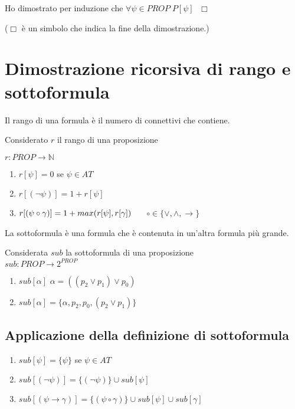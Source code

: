 \documentclass{article}
\theoremstyle{break}
\theoremstyle{break}
\theoremstyle{break}
\theoremstyle{break}
\begin{document}
Ho dimostrato per induzione che \( \forall \psi \in PROP \; P[\psi] \; \) \( \Box \)

(\( \Box \) è un simbolo che indica la fine della dimostrazione.)

\section{Dimostrazione ricorsiva di rango e sottoformula}
Il rango di una formula è il numero di connettivi che contiene.
\begin{definition}
	Considerato \( r \) il rango di una proposizione

	\( r: PROP \to \mathbb{N} \)

	\begin{enumerate}
		\item \( r[\psi] = 0 \) se \( \psi \in AT \)
		\item \( r[(\neg \psi)] = 1 + r[\psi] \)
		\item \( r[(\psi \circ \gamma )] = 1 + max(r[\psi], r[\gamma]) \hspace{5mm} \) \( \circ \in \{\vee, \wedge, \to \} \)

	\end{enumerate}
\end{definition}

La sottoformula è una formula che è contenuta in un'altra formula più grande.
\begin{definition}
	Considerata \( sub \) la sottoformula di una proposizione\\
	\( sub: PROP \to 2^{PROP} \)
	\begin{enumerate}
		\item \( sub[\alpha] \) \( \alpha = ((p_{2} \vee p_{1}) \vee p_{0} ) \)
		\item \( sub[\alpha] = \{\alpha, p_2, p_0, (p_2 \vee p_1)\} \)
	\end{enumerate}
\end{definition}

\subsection{Applicazione della definizione di sottoformula}
\begin{enumerate}
	\item \( sub[\psi] = \{ \psi \} \) se \( \psi \in AT \)
	\item \( sub[(\neg \psi)] = \{ (\neg \psi) \} \cup sub[\psi] \)
	\item \( sub[(\psi \to \gamma)] = \{(\psi \circ \gamma)\} \cup sub[\psi] \cup sub[\gamma] \)
\end{enumerate}
\end{document}
